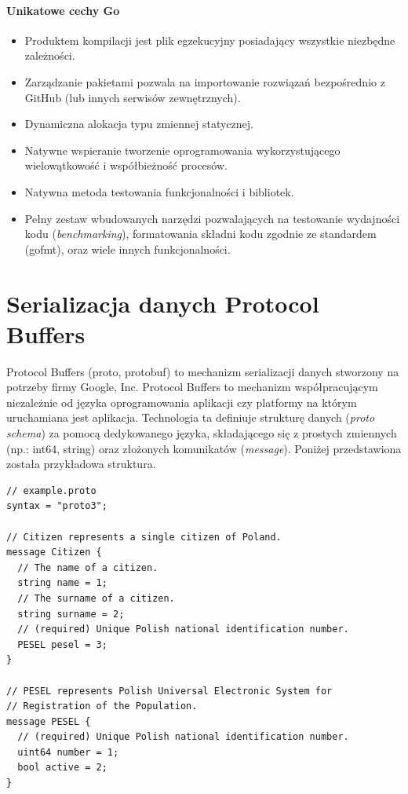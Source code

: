 \documentclass[a4paper,12pt,twoside,openany]{report}
\begin{document}
\paragraph{Unikatowe cechy Go}
\begin{itemize}
 \item Produktem kompilacji jest plik egzekucyjny posiadający wszystkie niezbędne zależności.
 \item Zarządzanie pakietami pozwala na importowanie rozwiązań bezpośrednio z GitHub (lub innych serwisów zewnętrznych).
 \item Dynamiczna alokacja typu zmiennej statycznej.
 \item Natywne wspieranie tworzenie oprogramowania wykorzystującego wielowątkowość i współbieżność procesów.
 \item Natywna metoda testowania funkcjonalności i bibliotek.
 \item Pełny zestaw wbudowanych narzędzi pozwalających na testowanie wydajności kodu (\textit{benchmarking}), formatowania składni kodu zgodnie ze standardem (gofmt),
       oraz wiele innych funkcjonalności.
\end{itemize}

\section{Serializacja danych Protocol Buffers}

Protocol Buffers (proto, protobuf) to mechanizm serializacji danych stworzony na potrzeby firmy Google, Inc.
Protocol Buffers to mechanizm współpracującym niezależnie od języka oprogramowania aplikacji czy platformy na którym uruchamiana jest aplikacja.
Technologia ta definiuje strukturę danych (\textit{proto schema}) za pomocą dedykowanego języka, składającego się z prostych zmiennych (np.: int64, string) 
oraz złożonych komunikatów (\textit{message}). Poniżej przedstawiona została przykładowa struktura.

\begin{lstlisting}
// example.proto
syntax = "proto3";

// Citizen represents a single citizen of Poland.
message Citizen {
  // The name of a citizen.
  string name = 1;
  // The surname of a citizen.
  string surname = 2;
  // (required) Unique Polish national identification number.
  PESEL pesel = 3;
}

// PESEL represents Polish Universal Electronic System for
// Registration of the Population.
message PESEL {
  // (required) Unique Polish national identification number.
  uint64 number = 1;
  bool active = 2;
}
\end{lstlisting}
\end{document}
